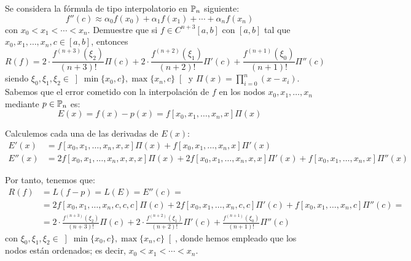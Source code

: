 \begin{ejercicio}\label{ej:2.1.4}
    Se considera la fórmula de tipo interpolatorio en $\mathbb{P}_n$ siguiente:
    \[
    f''(c) \approx \alpha_0 f(x_0) + \alpha_1 f(x_1) + \cdots + \alpha_n f(x_n)
    \]
    con $x_0 < x_1 < \cdots < x_n$. Demuestre que si $f \in C^{n+3}[a, b]$ con $[a, b]$ tal que $x_0, x_1, \ldots, x_n, c \in [a, b]$, entonces
    \[
    R(f) = 2\cdot \frac{f^{(n+3)}(\xi_2)}{(n + 3)!}\Pi(c) + 2\cdot \frac{f^{(n+2)}(\xi_1)}{(n + 2)!}\Pi'(c) + \frac{f^{(n+1)}(\xi_0)}{(n + 1)!}\Pi''(c)
    \]
    siendo $\xi_0, \xi_1, \xi_2 \in \left] \min\{x_0, c\}, \max\{x_n, c\} \right[$ y $\Pi(x) = \prod\limits_{i=0}^{n}(x - x_i)$.\\

    Sabemos que el error cometido con la interpolación de $f$ en los nodos $x_0, x_1, \ldots, x_n$ mediante $p\in \mathbb{P}_n$ es:
    \[
    E(x) = f(x)-p(x)= f[x_0, x_1, \ldots, x_n, x]\Pi(x)
    \]

    Calculemos cada una de las derivadas de $E(x)$:
    \begin{align*}
        E'(x) &= f[x_0, x_1, \ldots, x_n, x,x]\Pi(x) + f[x_0, x_1, \ldots, x_n, x]\Pi'(x)\\
        E''(x) &= 2f[x_0, x_1, \ldots, x_n, x,x,x]\Pi(x) + 2f[x_0, x_1, \ldots, x_n, x,x]\Pi'(x) + f[x_0, x_1, \ldots, x_n, x]\Pi''(x)
    \end{align*}

    Por tanto, tenemos que:
    \begin{align*}
        R(f) &= L(f-p)=L(E)=E''(c)
        =\\&= 2f[x_0, x_1, \ldots, x_n, c,c,c]\Pi(c) + 2f[x_0, x_1, \ldots, x_n, c,c]\Pi'(c) + f[x_0, x_1, \ldots, x_n, c]\Pi''(c)
        =\\&= 2\cdot \frac{f^{(n+3)}(\xi_2)}{(n + 3)!}\Pi(c) + 2\cdot \frac{f^{(n+2)}(\xi_1)}{(n + 2)!}\Pi'(c) + \frac{f^{(n+1)}(\xi_0)}{(n + 1)!}\Pi''(c)
    \end{align*}
    con $\xi_0, \xi_1, \xi_2 \in \left] \min\{x_0, c\}, \max\{x_n, c\} \right[$, donde hemos empleado que los nodos están ordenados; es decir, $x_0<x_1<\cdots<x_n$.

\end{ejercicio}

